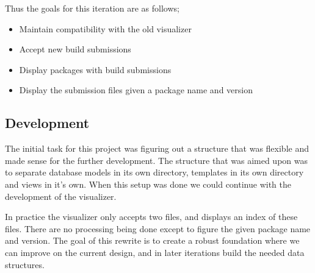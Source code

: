 \documentclass[../Main/thesis.tex]{subfiles}
\begin{document}
Thus the goals for this iteration are as follows;

\begin{itemize}
    \item Maintain compatibility with the old visualizer
    \item Accept new build submissions
    \item Display packages with build submissions
    \item Display the submission files given a package name and version
\end{itemize}

\subsection*{Development}%
\label{sub:first_iteration_development}
The initial task for this project was figuring out a structure that was flexible
and made sense for the further development. The structure that was aimed upon
was to separate database models in its own directory, templates in its own
directory and views in it's own. When this setup was done we could continue with
the development of the visualizer.

In practice the visualizer only accepts two files, and displays an index of
these files. There are no processing being done except to figure the given
package name and version. The goal of this rewrite is to create a robust
foundation where we can improve on the current design, and in later iterations
build the needed data structures.
\end{document}
